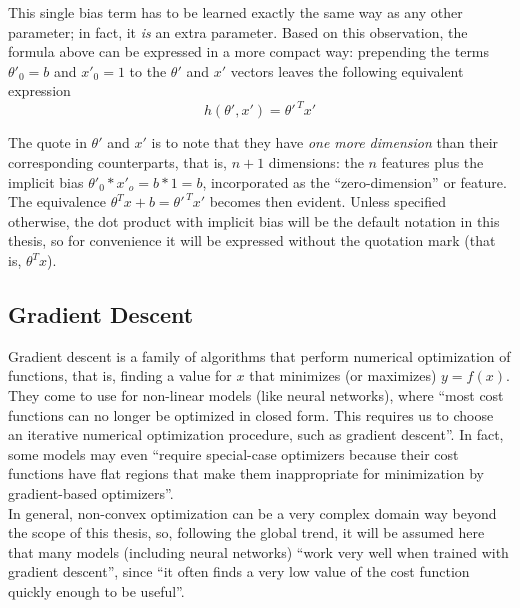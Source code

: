 This single bias term has to be learned exactly the same way as any other parameter; in fact, it {\it is} an extra parameter. Based on this observation, the formula above can be expressed in a more compact way: prepending the terms \(\theta'_0=b\) and \(x'_0=1\) to the \(\theta'\) and \(x'\) vectors leaves the following equivalent expression
\begin{equation*}
  h(\theta', x') = \theta'^{\,T}x'
\end{equation*}

The quote in \(\theta'\) and \(x'\) is to note that they have {\it one more dimension} than their corresponding counterparts, that is, \(n+1\) dimensions: the \(n\) features plus the implicit bias \(\theta'_0*x'_o=b*1=b\), incorporated as the ``zero-dimension'' or feature. The equivalence \(\theta^Tx+b= \theta'^{\,T}x'\) becomes then evident. Unless specified otherwise, the dot product with implicit bias will be the default notation in this thesis, so for convenience it will be expressed without the quotation mark (that is, \(\theta^Tx\)).

\subsection{Gradient Descent}\label{graddesc}
Gradient descent\cite{cauchy} is a family of algorithms that perform numerical optimization of functions, that is, finding a value for \(x\) that minimizes (or maximizes) \(y=f(x)\). They come to use for non-linear models (like neural networks), where ``most cost functions can no longer be optimized in closed form. This requires us to choose an iterative numerical optimization procedure, such as gradient descent''\cite[p.153]{goodfellow}. In fact, some models may even ``require special-case optimizers because their cost functions have flat regions that make them inappropriate for minimization by gradient-based optimizers''\cite[p.154]{goodfellow}.\\

In general, non-convex optimization can be a very complex domain way beyond the scope of this thesis, so, following the global trend, it will be assumed here that many models (including neural networks) ``work very well when trained with gradient descent''\cite[p. 152]{goodfellow}, since  ``it often finds a very low value of the cost function quickly enough to be useful''\cite[p. 152]{goodfellow}.


